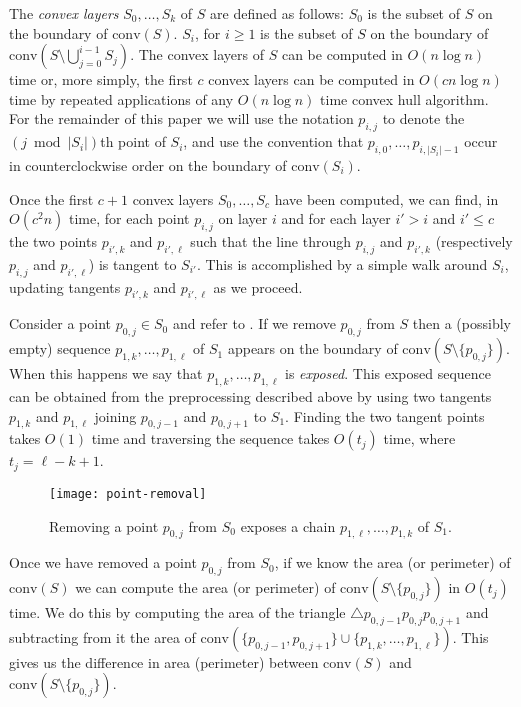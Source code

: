 \documentclass[lotsofwhite]{patmorin}
\newcommand{\ch}{\mathrm{conv}}
\begin{document}
The \emph{convex layers} $S_0,\ldots,S_k$ of $S$ are defined as
follows: $S_0$ is the subset of $S$ on the boundary of $\ch(S)$.
$S_i$, for $i\ge 1$ is the subset of $S$ on the boundary of
$\ch(S\setminus\bigcup_{j=0}^{i-1} S_j)$.  The convex layers of $S$
can be computed in $O(n\log n)$ time \cite{c85,hs92} or, more simply,
the first $c$ convex layers can be computed in $O(cn\log n)$ time by
repeated applications of any $O(n\log n)$ time convex hull algorithm.
For the remainder of this paper we will use the notation $p_{i,j}$ to
denote the $(j\bmod |S_i|)$th point of $S_i$, and use the convention
that $p_{i,0},\ldots,p_{i,|S_i|-1}$ occur in counterclockwise order on
the boundary of $\ch(S_i)$.

Once the first $c+1$ convex layers $S_0,\ldots,S_c$ have been
computed, we can find, in $O(c^2 n)$ time, for each point $p_{i,j}$ on
layer $i$ and for each layer $i'> i$ and $i'\le c$ the two points
$p_{i',k}$ and $p_{i',\ell}$ such that the line through $p_{i,j}$ and
$p_{i',k}$ (respectively $p_{i,j}$ and $p_{i',\ell}$) is tangent to
$S_{i'}$.  This is accomplished by a simple walk around $S_i$,
updating tangents $p_{i',k}$ and $p_{i',\ell}$ as we proceed.

Consider a point $p_{0,j}\in S_0$ and refer to .
If we remove $p_{0,j}$ from $S$ then a (possibly empty) sequence
$p_{1,k},\ldots,p_{1,\ell}$ of $S_1$ appears on the boundary of
$\ch(S\setminus\{p_{0,j}\})$.  When this happens we say that
$p_{1,k},\ldots,p_{1,\ell}$ is \emph{exposed}.  This exposed sequence
can be obtained from the preprocessing described above by using two
tangents $p_{1,k}$ and $p_{1,\ell}$ joining $p_{0,j-1}$ and
$p_{0,j+1}$ to $S_1$.  Finding the two tangent points takes $O(1)$
time and traversing the sequence takes $O(t_j)$ time, where
$t_j=\ell-k+1$.

\begin{figure}
\begin{center}\texttt{[image: point-removal]}\end{center}
\caption{Removing a point $p_{0,j}$ from $S_0$ exposes a chain
$p_{1,\ell},\ldots,p_{1,k}$ of $S_1$.}
\end{figure}

Once we have removed a point $p_{0,j}$ from $S_0$, if we know the area
(or perimeter) of $\ch(S)$ we can compute the area (or perimeter) of
$\ch(S\setminus\{p_{0,j}\})$ in $O(t_j)$ time.  We do this by
computing the area of the triangle $\triangle
p_{0,j-1}p_{0,j}p_{0,j+1}$ and subtracting from it the area of
$\ch(\{p_{0,j-1},p_{0,j+1}\}\cup\{p_{1,k},\ldots,p_{1,\ell}\})$.  This
gives us the difference in area (perimeter) between $\ch(S)$ and
$\ch(S\setminus\{p_{0,j}\})$.
\end{document}
